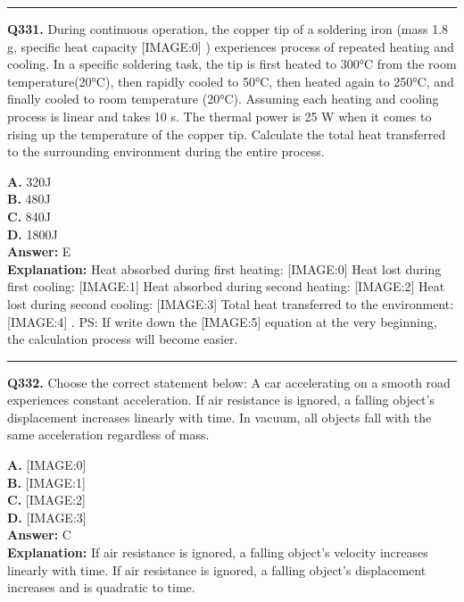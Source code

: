 \documentclass[12pt]{article}
\begin{document}
\hrule
\vspace{1em}


\noindent
\textbf{Q331.} During continuous operation, the copper tip of a soldering iron (mass 1.8 g, specific heat capacity
[IMAGE:0]
) experiences process of repeated heating and cooling. In a specific soldering task, the tip is first heated to 300°C from the room temperature(20°C), then rapidly cooled to 50°C, then heated again to 250°C, and finally cooled to room temperature (20°C). Assuming each heating and cooling process is linear and takes 10 s. The thermal power is 25 W when it comes to rising up the temperature of the copper tip.
Calculate the total heat transferred to the surrounding environment during the entire process.



\textbf{A.} 320J \\
\textbf{B.} 480J \\
\textbf{C.} 840J \\
\textbf{D.} 1800J \\

\textbf{Answer:} E \\
\textbf{Explanation:} Heat absorbed during first heating:
[IMAGE:0]
Heat lost during first cooling:
[IMAGE:1]
Heat absorbed during second heating:
[IMAGE:2]
Heat lost during second cooling:
[IMAGE:3]
Total heat transferred to the environment:
[IMAGE:4]
.
PS: If write down the
[IMAGE:5]
equation at the very beginning, the calculation process will become easier.

\hrule
\vspace{1em}


\noindent
\textbf{Q332.} Choose the correct statement below:
A car accelerating on a smooth road experiences constant acceleration.
If air resistance is ignored, a falling object’s displacement increases linearly with time.
In vacuum, all objects fall with the same acceleration regardless of mass.



\textbf{A.} [IMAGE:0] \\
\textbf{B.} [IMAGE:1] \\
\textbf{C.} [IMAGE:2] \\
\textbf{D.} [IMAGE:3] \\

\textbf{Answer:} C \\
\textbf{Explanation:} If air resistance is ignored, a falling object’s velocity increases linearly with time. If air resistance is ignored, a falling object’s displacement increases and is quadratic to time.
\end{document}

